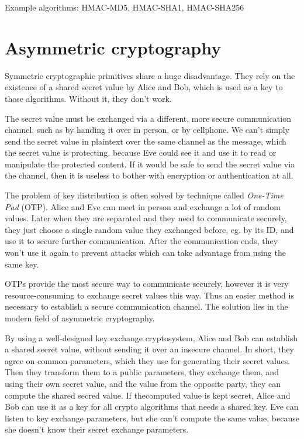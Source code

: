 Example algorithms: HMAC-MD5, HMAC-SHA1, HMAC-SHA256

\section{Asymmetric cryptography}

Symmetric cryptographic primitives share a huge disadvantage. They rely on the existence of a shared secret value by Alice and Bob, which is used as a key to those algorithms. Without it, they don't work.

The secret value must be exchanged via a different, more secure communication channel, such as by handing it over in person, or by cellphone. We can't simply send the secret value in plaintext over the same channel as the message, which the secret value is protecting, because Eve could see it and use it to read or manipulate the protected content. If it would be safe to send the secret value via the channel, then it is useless to bother with encryption or authentication at all.

The problem of key distribution is often solved by technique called \textit{One-Time Pad} (OTP). Alice and Eve can meet in person and exchange a lot of random values. Later when they are separated and they need to communicate securely, they just choose a single random value they exchanged before, eg. by its ID, and use it to secure further communication. After the communication ends, they won't use it again to prevent attacks which can take advantage from using the same key.

OTPs provide the most secure way to communicate securely, however it is very resource-consuming to exchange secret values this way. Thus an easier method is necessary to establish a secure communication channel. The solution lies in the modern field of asymmetric cryptography.

By using a well-designed key exchange cryptosystem, Alice and Bob can establish a shared secret value, without sending it over an insecure channel. In short, they agree on common parameters, which they use for generating their secret values. Then they transform them to a public parameters, they exchange them, and using their own secret value, and the value from the opposite party, they can compute the shared secred value. If thecomputed value is kept secret, Alice and Bob can use it as a key for all crypto algorithms that needs a shared key. Eve can listen to key exchange parameters, but she can't compute the same value, because she doesn't know their secret exchange parameters.

